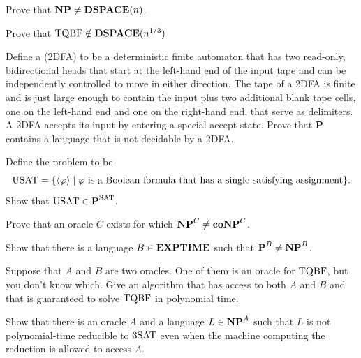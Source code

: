   \begin{problem}
    Prove that $\textbf{NP} \neq \textbf{DSPACE}(n)$.
  \end{problem}

  \begin{problem}
    Prove that $\text{TQBF} \notin \textbf{DSPACE}(n^{1/3})$
  \end{problem}

  \begin{problem}
    Define a  (2DFA) to be a deterministic finite automaton that has two read-only, bidirectional heads that start at the left-hand end of the input tape and can be independently controlled to move in either direction. The tape of a 2DFA is finite and is just large enough to contain the input plus two additional blank tape cells, one on the left-hand end and one on the right-hand end, that serve as delimiters. A 2DFA accepts its input by entering a special accept state. Prove that $\textbf{P}$ contains a language that is not decidable by a 2DFA.
  \end{problem}

  \begin{problem}
    Define the  problem to be
    \[ \text{USAT} = \{ \left< \varphi \right> \mid \text{$\varphi$ is a Boolean formula that has a single satisfying assignment} \}. \]
    Show that $\text{USAT} \in \textbf{P}^{\text{SAT}}$.
  \end{problem}

  \begin{problem}
    Prove that an oracle $C$ exists for which $\textbf{NP}^C \neq \textbf{coNP}^C$.
  \end{problem}

  \begin{problem}
    Show that there is a language $B \in \textbf{EXPTIME}$ such that $\textbf{P}^B \neq \textbf{NP}^B$.
  \end{problem}

  \begin{problem}
    Suppose that $A$ and $B$ are two oracles. One of them is an oracle for $\text{TQBF}$, but you don't know which. Give an algorithm that has access to both $A$ and $B$ and that is guaranteed to solve $\text{TQBF}$ in polynomial time.
  \end{problem}

  \begin{problem}
    Show that there is an oracle $A$ and a language $L \in \textbf{NP}^A$ such that $L$ is not polynomial-time reducible to $\text{3SAT}$ even when the machine computing the reduction is allowed to access $A$.
  \end{problem}

